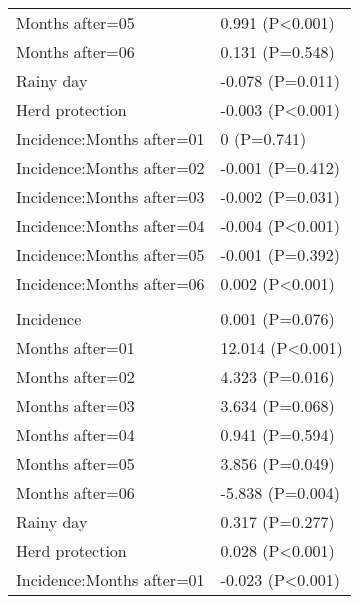 \documentclass[]{article}
\begin{document}
\begin{longtable}[t]{ll}
\hspace{1em}Months after=05 & 0.991 (P<0.001)\\
\hspace{1em}Months after=06 & 0.131 (P=0.548)\\
\hspace{1em}Rainy day & -0.078 (P=0.011)\\
\hspace{1em}Herd protection & -0.003 (P<0.001)\\
\hspace{1em}Incidence:Months after=01 & 0 (P=0.741)\\
\hspace{1em}Incidence:Months after=02 & -0.001 (P=0.412)\\
\hspace{1em}Incidence:Months after=03 & -0.002 (P=0.031)\\
\hspace{1em}Incidence:Months after=04 & -0.004 (P<0.001)\\
\hspace{1em}Incidence:Months after=05 & -0.001 (P=0.392)\\
\hspace{1em}Incidence:Months after=06 & 0.002 (P<0.001)\\
\addlinespace[1.5em]
\multicolumn{2}{l}{\textbf{Temporary not field worker}}\\
\hspace{1em}Incidence & 0.001 (P=0.076)\\
\hspace{1em}Months after=01 & 12.014 (P<0.001)\\
\hspace{1em}Months after=02 & 4.323 (P=0.016)\\
\hspace{1em}Months after=03 & 3.634 (P=0.068)\\
\hspace{1em}Months after=04 & 0.941 (P=0.594)\\
\hspace{1em}Months after=05 & 3.856 (P=0.049)\\
\hspace{1em}Months after=06 & -5.838 (P=0.004)\\
\hspace{1em}Rainy day & 0.317 (P=0.277)\\
\hspace{1em}Herd protection & 0.028 (P<0.001)\\
\hspace{1em}Incidence:Months after=01 & -0.023 (P<0.001)\\

\end{longtable}
\end{document}
